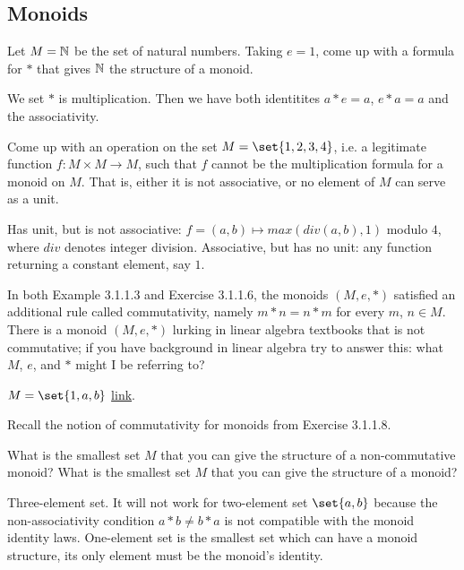 \documentclass{article}
\begin{document}
\subsection{Monoids}


Let $M = \mathbb{N}$ be the set of natural numbers. Taking $e = 1$, come up with a
formula for $*$ that gives $\mathbb{N}$ the structure of a monoid.

\ans

We set $*$ is multiplication. Then we have both identitites $a*e = a$, $e*a = a$
and the associativity.



Come up with an operation on the set $M = \set{1, 2, 3, 4}$, i.e. a legitimate
function $f : M \times M \to M$, such that $f$ cannot be the multiplication
formula for a monoid on $M$. That is, either it is not associative, or no
element of $M$ can serve as a unit.

\ans

\es Has unit, but is not associative: $f = (a,b) \mapsto max(div(a,b), 1)$
    modulo $4$, where $div$ denotes integer division.
\ei Associative, but has no unit: any function returning a constant element, say
    $1$.
\ee


In both Example 3.1.1.3 and Exercise 3.1.1.6, the monoids $(M, e, *)$ satisfied
an additional rule called commutativity, namely $m*n = n*m$ for every $m$, $n
\in M$.  There is a monoid $(M, e, *)$ lurking in linear algebra textbooks that
is not commutative; if you have background in linear algebra try to answer this:
what $M$, $e$, and $*$ might I be referring to?

\ans

$M = \set{1,a,b}$ \href{https://math.stackexchange.com/a/207813/374432}{link}.


Recall the notion of commutativity for monoids from Exercise 3.1.1.8.

\es What is the smallest set $M$ that you can give the structure of a
    non-commutative monoid?
\ei What is the smallest set $M$ that you can give the structure of a monoid?
\ee

\ans

\es Three-element set. It will not work for two-element set $\set{a,b}$ because
    the non-associativity condition $a*b \ne b*a$ is not compatible with the
    monoid identity laws.
\ei One-element set is the smallest set which can have a monoid structure, its
    only element must be the monoid's identity.
\ee
\end{document}
